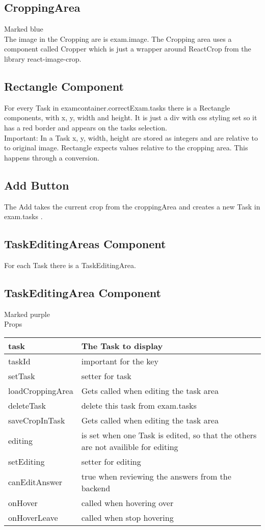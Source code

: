 \subsection{CroppingArea}
Marked blue\\
The image in the Cropping are is exam.image. The Cropping area uses
a component called Cropper which is just a wrapper around ReactCrop
from the library react-image-crop.

\subsection{Rectangle Component}
For every Task in examcontainer.correctExam.tasks there is a
Rectangle components, with x, y, width and height. It is just a div
with css styling set so it has a red border and appears on the tasks
selection.\\
Important: In a Task x, y, width, height are stored as integers and
are relative to to original image. Rectangle expects values relative
to the cropping area. This happens through a conversion.

\subsection{Add Button}
The Add takes the current crop from the croppingArea and creates a
new Task in exam.tasks .

\subsection{TaskEditingAreas Component}
For each Task there is a TaskEditingArea.

\subsection{TaskEditingArea Component}
Marked purple\\

Props\\
\begin{tabularx}{\textwidth}{|l|X|} 
\hline
task & The Task to display \\
\hline
taskId & important for the key \\
\hline
setTask & setter for task \\
\hline
loadCroppingArea & Gets called when editing the task area \\
\hline
deleteTask & delete this task from exam.tasks \\
\hline
saveCropInTask & Gets called when editing the task area \\
\hline
editing & is set when one Task is edited, so that the others are not
availible for editing\\
\hline
setEditing & setter for editing \\
\hline
canEditAnswer & true when reviewing the answers from the backend \\
\hline
onHover & called when hovering over \\
\hline
onHoverLeave & called when stop hovering \\
\hline
\end{tabularx}

